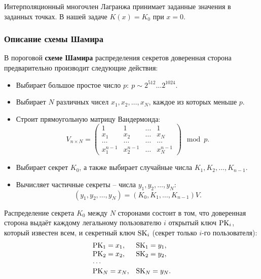 Интерполяционный многочлен Лагранжа принимает заданные значения в заданных точках. В нашей задаче $K(x)=K_{0}$ при $x=0$.


\subsubsection{Описание схемы Шамира}

В пороговой \textbf{схеме Шамира} распределения секретов доверенная сторона предварительно производит следующие действия:
\begin{itemize}
    \item Выбирает большое простое число $p: ~ p \sim 2^{512} \dots 2^{1024}$.
    \item Выбирает $N$ различных чисел $x_1, x_2, \dots, x_N$, каждое из которых меньше $p$.
    \item Строит прямоугольную матрицу Вандермонда:
        \[
            V_{n \times N} = \left( \begin{array}{cccc}
                {1} & {1} & { \ldots } & {1} \\
                {x_{1} } & {x_{2} } & { \ldots } & {x_{N} } \\
                { \ldots } & { \ldots } & { \ldots } & { \ldots } \\
                {x_{1}^{n-1} } & {x_{2}^{n-1} } & { \ldots } & {x_{N}^{n-1} }
            \end{array} \right) \mod p.
        \]
    \item Выбирает секрет $K_0$, а также выбирает случайные числа $K_1, K_2, \dots, K_{n-1}$.
    \item Вычисляет частичные секреты -- числа $y_1, y_2, \dots, y_N$:
        \[ (y_1, y_2, \dots, y_N) = (K_0, K_1, \dots, K_{n-1}) V. \]
\end{itemize}

Распределение секрета $K_0$ между $N$ сторонами состоит в том, что доверенная сторона выдаёт каждому легальному пользователю $i$ открытый ключ $\textrm{PK}_i$, который известен всем, и секретный ключ $\textrm{SK}_i$ (секрет только $i$-го пользователя):
\[ \begin{array}{ll}
    \textrm{PK}_1 = x_1, & \textrm{SK}_1 = y_1, \\
    \textrm{PK}_2 = x_2, & \textrm{SK}_2 = y_2, \\
    \cdots & \\
    \textrm{PK}_N = x_N, & \textrm{SK}_N = y_N. \\
\end{array} \]


